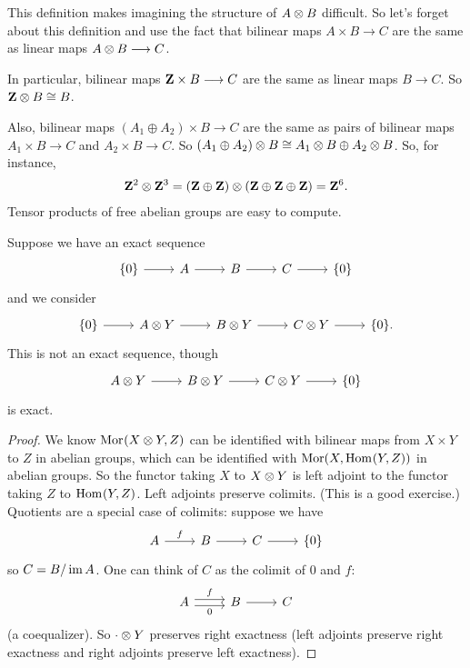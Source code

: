 \documentclass[11pt, oneside,margin=1in]{article}
\begin{document}
This definition makes imagining the structure of $A\otimes B$ difficult. So let's forget about this definition and use the fact that bilinear maps $A\times B\longrightarrow C$ are the same as linear maps $A\otimes B\longrightarrow C$. 

In particular, bilinear maps $\mathbf Z \times B\longrightarrow C$ are the same as linear maps $B\longrightarrow C$. So $\mathbf Z\otimes B\cong B$. %

Also, bilinear maps $(A_1\oplus A_2) \times B\longrightarrow C$ are the same as pairs of bilinear maps $A_1\times B\longrightarrow C$ and $A_2\times B\longrightarrow C$. So $(A_1\oplus A_2) \otimes B \cong A_1 \otimes B \oplus A_2 \otimes B$. So, for instance, \begin{align*}
	\mathbf Z^2 \otimes \mathbf Z^3 = (\mathbf{Z}\oplus\mathbf{Z})\otimes(\mathbf{Z}\oplus\mathbf{Z}\oplus \mathbf{Z})=\mathbf Z^6.
\end{align*}
Tensor products of free abelian groups are easy to compute. 

Suppose we have an exact sequence
\[
\begin{tikzcd}
	\{0\}\arrow[r]&A\arrow[r]&B\arrow[r]&C\arrow[r]	&\{0\}
\end{tikzcd}
\]
and we consider
\[
\begin{tikzcd}
        \{0\}\arrow[r]&A\tensor Y\arrow[r]&B\tensor Y\arrow[r]&C\tensor Y\arrow[r] &\{0\}.
\end{tikzcd}
\]
This is not an exact sequence, though
\[
\begin{tikzcd}
        A\tensor Y\arrow[r]&B\tensor Y\arrow[r]&C\tensor Y\arrow[r] &\{0\}
\end{tikzcd}
\]
is exact.

\begin{proof}
We know $\operatorname{Mor}_{}(X\otimes Y, Z)$ can be identified with bilinear maps from $X\times Y$ to $Z$ in abelian groups, which can be identified with $\operatorname{Mor}(X, \operatorname{Hom}_{}(Y, Z))$ in abelian groups. So the functor taking $X$ to $X\otimes Y$ is left adjoint to the functor taking $Z$ to $\operatorname{Hom}_{}(Y, Z)$. Left adjoints preserve colimits. (This is a good exercise.) Quotients are a special case of colimits: suppose we have
\[
\begin{tikzcd}
	A \arrow[r, "f"] & B \arrow[r]& C \arrow[r]&\{0\}
\end{tikzcd}
\]
so $C=B/\operatorname{im} A$. One can think of $C$ as the colimit of $0$ and $f$:
 \[
\begin{tikzcd}
A \arrow[r, "f", shift left]\arrow[r, "0", shift right, swap] & B \arrow[r]& C
\end{tikzcd}
\]
(a coequalizer). So $\cdot\otimes Y$ preserves right exactness (left adjoints preserve right exactness and right adjoints preserve left exactness).
\end{proof}
\end{document}
